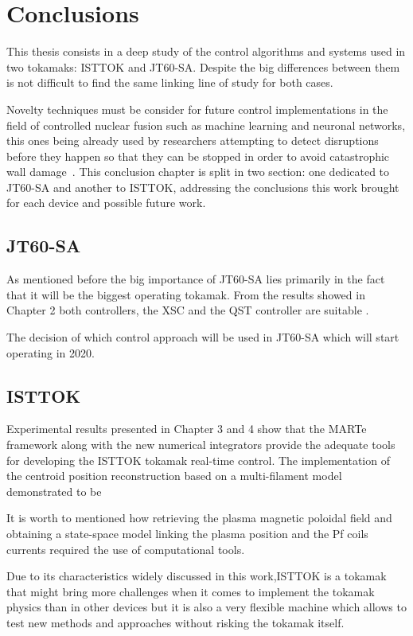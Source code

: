 \chapter{Conclusions}


This thesis consists in a deep study of the control algorithms and systems used in two tokamaks: ISTTOK and JT60-SA. Despite the big differences between them is not difficult to find the same linking line of study for both cases.\smallskip

Novelty techniques must be consider for future control implementations in the field of controlled nuclear fusion  such as machine learning and neuronal networks, this ones being already  used by researchers  attempting to detect disruptions before they happen so that they can be stopped in order to avoid catastrophic wall damage~\cite[Chapter~6]{Paluszek2020}. This conclusion chapter is split in two section: one dedicated to JT60-SA and another to ISTTOK, addressing the conclusions  this work brought for each device and possible future work.

\section{JT60-SA}

As mentioned before the big importance of JT60-SA  lies primarily in the fact that it will be the biggest operating tokamak. From the results showed in Chapter 2 both controllers, the XSC and the QST controller are suitable  . \smallskip 

The decision of which control approach   will be used in JT60-SA which will start operating in 2020.

\section{ISTTOK}

Experimental results presented in Chapter 3 and 4 show that the MARTe framework along with the new numerical integrators provide the adequate tools for developing the ISTTOK tokamak real-time control. The implementation of the centroid position reconstruction based on a multi-filament model demonstrated to be  \smallskip

It is worth to mentioned how retrieving the plasma magnetic poloidal field and obtaining a state-space model linking the plasma position and the Pf coils currents required the use of computational tools.\smallskip

Due to its characteristics widely discussed in this work,ISTTOK is a tokamak that might bring  more challenges when it comes to implement the tokamak physics than in other devices but it is also a very flexible machine which allows to test new methods and approaches without risking the tokamak itself.\smallskip

